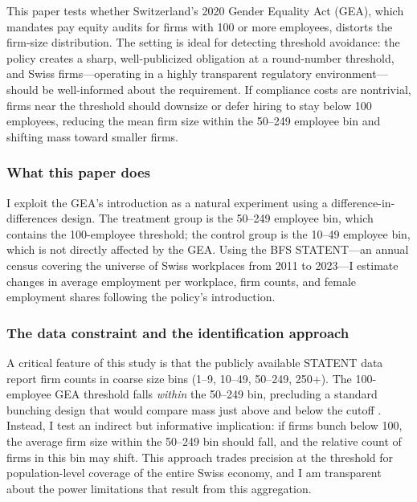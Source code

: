 \documentclass[12pt]{article}
\begin{document}
This paper tests whether Switzerland's 2020 Gender Equality Act (GEA), which mandates pay equity audits for firms with 100 or more employees, distorts the firm-size distribution. The setting is ideal for detecting threshold avoidance: the policy creates a sharp, well-publicized obligation at a round-number threshold, and Swiss firms---operating in a highly transparent regulatory environment---should be well-informed about the requirement. If compliance costs are nontrivial, firms near the threshold should downsize or defer hiring to stay below 100 employees, reducing the mean firm size within the 50--249 employee bin and shifting mass toward smaller firms.

\subsubsection*{What this paper does} I exploit the GEA's introduction as a natural experiment using a difference-in-differences design. The treatment group is the 50--249 employee bin, which contains the 100-employee threshold; the control group is the 10--49 employee bin, which is not directly affected by the GEA. Using the BFS STATENT---an annual census covering the universe of Swiss workplaces from 2011 to 2023---I estimate changes in average employment per workplace, firm counts, and female employment shares following the policy's introduction.

\subsubsection*{The data constraint and the identification approach} A critical feature of this study is that the publicly available STATENT data report firm counts in coarse size bins (1--9, 10--49, 50--249, 250+). The 100-employee GEA threshold falls \emph{within} the 50--249 bin, precluding a standard bunching design that would compare mass just above and below the cutoff \citep{kleven2016bunching, chetty2011adjustment}. Instead, I test an indirect but informative implication: if firms bunch below 100, the average firm size within the 50--249 bin should fall, and the relative count of firms in this bin may shift. This approach trades precision at the threshold for population-level coverage of the entire Swiss economy, and I am transparent about the power limitations that result from this aggregation.
\end{document}
